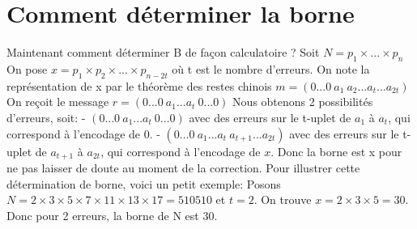 \documentclass[a4paper, 11pt]{report}
\begin{document}
\newpage

\section{Comment déterminer la borne}


Maintenant comment déterminer B de façon calculatoire ? \newline
Soit $N=p_1\times ...\times p_n$
On pose $x=p_1 \times p_2 \times ... \times p_{n-2t}$ où t est le nombre d'erreurs. \newline
On note la représentation de x par le théorème des restes chinois $m=(0...0 \: a_1 \: a_2 ... a_t ... a_{2t})$ \newline
On reçoit le message $r=(0...0\: a_1...a_t \: 0...0)$ \newline
Nous obtenons 2 possibilités d'erreurs, soit: \newline
- $(0...0 \: a_1...a_t\: 0...0) $ avec des erreurs sur le t-uplet de $a_1$ à $a_t$, qui correspond à l'encodage de 0. \newline
- $(0...0 \: a_1...a_t \: a_{t+1}...a_{2t})$ avec des erreurs sur le t-uplet de $a_{t+1}$ à $a_{2t}$, qui correspond à l'encodage de $x$. \newline
Donc la borne est x pour ne pas laisser de doute au moment de la correction. \newline
\newline
Pour illustrer cette détermination de borne, voici un petit exemple: \newline
Posons $N=2\times 3\times 5\times 7\times 11\times 13 \times 17= 510510$ et $t=2$. \newline
On trouve $x=2\times 3\times 5=30$. Donc pour 2 erreurs, la borne de N est 30.
\end{document}
